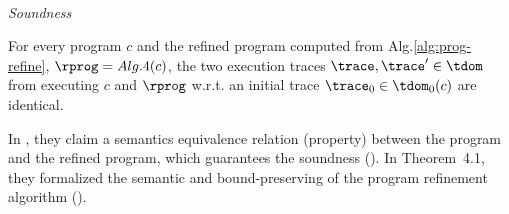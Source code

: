%
\\
\emph{Soundness}
\begin{thm}
  \label{thm:sound_refined-prog}
  For every program $c$ and the refined program computed from Alg.\ref{alg:prog-refine}, $\rprog = Alg.4(c)$,
  the two execution traces $\trace, \trace' \in \tdom$
  from executing $c$ and $\rprog$ w.r.t. an initial trace $\trace_0 \in \tdom_0(c)$ are identical.
\end{thm}
In \cite{GulwaniJK09}, they claim a semantics equivalence relation (property)
between the program and the refined program, which guarantees the soundness ().
%
In Theorem~4.1, they formalized the semantic and bound-preserving of the program refinement algorithm
().
%
